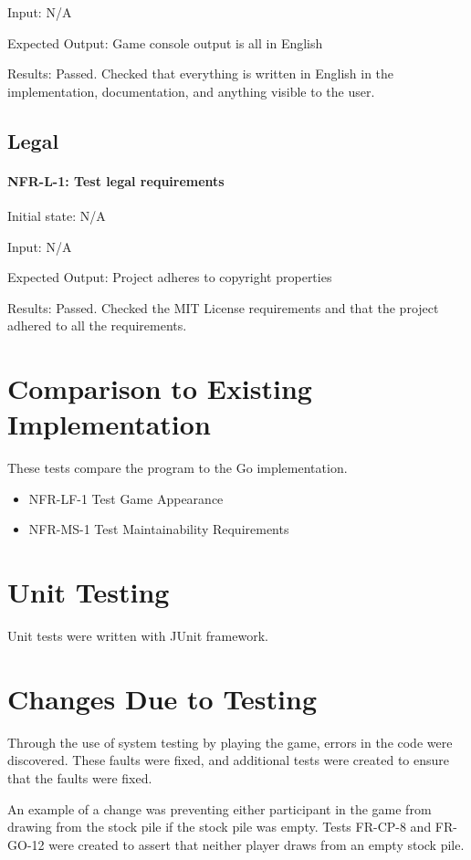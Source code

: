 \documentclass[12pt, titlepage]{article}
\begin{document}
Input: N/A

Expected Output: Game console output is all in English

Results: Passed. Checked that everything is written in English in the implementation, documentation, and anything visible to the user.

\subsection{Legal}

\paragraph{NFR-L-1: Test legal requirements\\}

Initial state: N/A

Input: N/A

Expected Output: Project adheres to copyright properties

Results: Passed. Checked the MIT License requirements and that the project adhered to all the requirements. 

\section{Comparison to Existing Implementation}	
These tests compare the program to the Go implementation.
\begin{itemize}
    \item NFR-LF-1 Test Game Appearance
    \item NFR-MS-1 Test Maintainability Requirements
\end{itemize}

\section{Unit Testing}
Unit tests were written with JUnit framework. 

\section{Changes Due to Testing}
Through the use of system testing by playing the game, errors in the code were discovered. These faults were fixed, and additional tests were created to ensure that the faults were fixed. 

An example of a change was preventing either participant in the game from drawing from the stock pile if the stock pile was empty. Tests FR-CP-8 and FR-GO-12 were created to assert that neither player draws from an empty stock pile.
\end{document}
